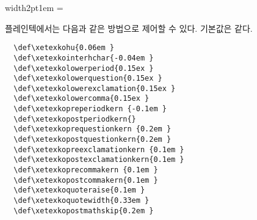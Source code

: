 \documentclass[a4paper]{article}
\def\grayvrule{\color{white!80!black}\vrule width2pt\color{black}}
\newenvironment{plaintex}
  {\par\medskip\leavevmode\hbox\bgroup\grayvrule\kern1em
    \vbox\bgroup\hsize=\dimexpr\textwidth-12pt\relax\small
  }{\egroup\egroup\par\medskip}
\begin{document}
\begin{plaintex}
플레인텍에서는 다음과 같은 방법으로 제어할 수 있다. 기본값은  같다.
\begin{verbatim}
  \def\xetexkohu{0.06em }
  \def\xetexkointerhchar{-0.04em }
  \def\xetexkolowerperiod{0.15ex }
  \def\xetexkolowerquestion{0.15ex }
  \def\xetexkolowerexclamation{0.15ex }
  \def\xetexkolowercomma{0.15ex }
  \def\xetexkopreperiodkern {-0.1em }
  \def\xetexkopostperiodkern{}
  \def\xetexkoprequestionkern {0.2em }
  \def\xetexkopostquestionkern{0.2em }
  \def\xetexkopreexclamationkern {0.1em }
  \def\xetexkopostexclamationkern{0.1em }
  \def\xetexkoprecommakern {0.1em }
  \def\xetexkopostcommakern{0.1em }
  \def\xetexkoquoteraise{0.1em }
  \def\xetexkoquotewidth{0.33em }
  \def\xetexkopostmathskip{0.2em }
\end{verbatim}
\end{plaintex}
\end{document}
